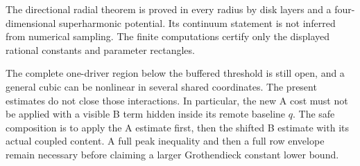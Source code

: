 The directional radial theorem is proved in every radius by disk layers
and a four-dimensional superharmonic potential. Its continuum statement
is not inferred from numerical sampling. The finite computations certify
only the displayed rational constants and parameter rectangles.

The complete one-driver region below the buffered threshold is still
open, and a general cubic can be nonlinear in several shared coordinates.
The present estimates do not close those interactions. In particular,
the new A cost must not be applied with a visible B term hidden inside
its remote baseline $q$. The safe composition is to apply the A estimate
first, then the shifted B estimate with its actual coupled content.
A full peak inequality and then a full row envelope remain necessary
before claiming a larger Grothendieck constant lower bound.

